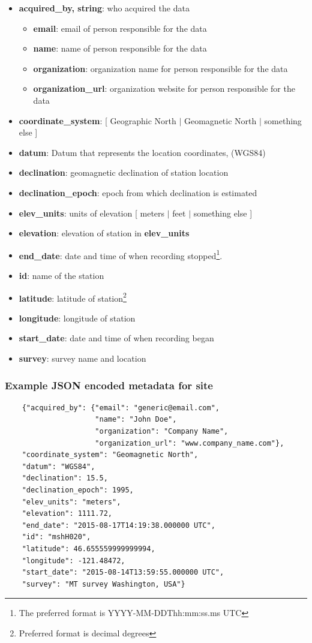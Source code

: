 \documentclass{article}
\newcommand{\attr}[1]{\textbf{#1}}
\begin{document}
\begin{itemize}
	\setlength{\itemsep}{.05em}
	\item \attr{acquired\_by, string}: who acquired the data
	\begin{itemize}
		\setlength{\itemsep}{.05em}
		\item \attr{email}: email of person responsible for the data
		\item \attr{name}: name of person responsible for the data
		\item \attr{organization}: organization name for person responsible for the data
		\item \attr{organization\_url}: organization website for person responsible for the data
	\end{itemize}
	\item \attr{coordinate\_system}: [ Geographic North $|$ Geomagnetic North $|$ something else ]
	\item \attr{datum}: Datum that represents the location coordinates, (WGS84)
	\item \attr{declination}: geomagnetic declination of station location
	\item \attr{declination\_epoch}: epoch from which declination is estimated
	\item \attr{elev\_units}: units of elevation [ meters $|$ feet $|$ something else ]
	\item \attr{elevation}: elevation of station in \attr{elev\_units}
	\item \attr{end\_date}: date and time of when recording stopped\footnote[1]{The preferred format is YYYY-MM-DDThh:mm:ss.ms UTC}.
	\item \attr{id}: name of the station
	\item \attr{latitude}: latitude of station\footnote[2]{Preferred format is decimal degrees}
	\item \attr{longitude}: longitude of station\footnotemark[2]
	\item \attr{start\_date}: date and time of when recording began\footnotemark[1]
	\item \attr{survey}: survey name and location  
\end{itemize}

\subsubsection{Example JSON encoded metadata for \textbf{site}}
\begin{verbatim}
	{"acquired_by": {"email": "generic@email.com",
	                 "name": "John Doe",
	                 "organization": "Company Name",
	                 "organization_url": "www.company_name.com"},
	"coordinate_system": "Geomagnetic North",
	"datum": "WGS84",
	"declination": 15.5,
	"declination_epoch": 1995,
	"elev_units": "meters",
	"elevation": 1111.72,
	"end_date": "2015-08-17T14:19:38.000000 UTC",
	"id": "mshH020",
	"latitude": 46.655559999999994,
	"longitude": -121.48472,
	"start_date": "2015-08-14T13:59:55.000000 UTC",
	"survey": "MT survey Washington, USA"}
\end{verbatim}
\end{document}
